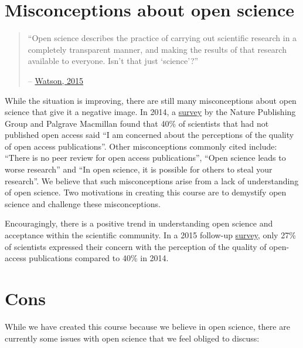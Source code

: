 \documentclass[
]{book}
\begin{document}
\hypertarget{misconceptions-about-open-science}{%
\section{Misconceptions about open science}\label{misconceptions-about-open-science}}

\begin{quote}
``Open science describes the practice of carrying out scientific research in a completely transparent manner, and making the results of that research available to everyone. Isn't that just `science'?''

-- \href{https://genomebiology.biomedcentral.com/articles/10.1186/s13059-015-0669-2}{Watson, 2015}
\end{quote}

While the situation is improving, there are still many misconceptions about open science that give it a negative image. In 2014, a \href{https://group.springernature.com/gp/group/media/press-releases/archive-2015/perceptions-of-open-access-publishing-are-changing-for-the-bette/12000378}{survey} by the Nature Publishing Group and Palgrave Macmillan found that 40\% of scientists that had not published open access said ``I am concerned about the perceptions of the quality of open access publications''. Other misconceptions commonly cited include: ``There is no peer review for open access publications'', ``Open science leads to worse research'' and ``In open science, it is possible for others to steal your research''. We believe that such misconceptions arise from a lack of understanding of open science. Two motivations in creating this course are to demystify open science and challenge these misconceptions.

Encouragingly, there is a positive trend in understanding open science and acceptance within the scientific community. In a 2015 follow-up \href{https://group.springernature.com/gp/group/media/press-releases/archive-2015/perceptions-of-open-access-publishing-are-changing-for-the-bette/12000378}{survey}, only 27\% of scientists expressed their concern with the perception of the quality of open-access publications compared to 40\% in 2014.

\hypertarget{cons}{%
\section{Cons}\label{cons}}

While we have created this course because we believe in open science, there are currently some issues with open science that we feel obliged to discuss:
\end{document}
